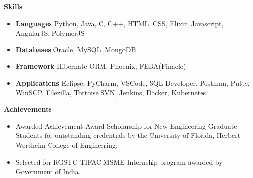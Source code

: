 \documentclass[letterpaper,12pt]{article}[leftmargin=*]
\def \entryspacing {-2pt}
\def \entryspacingnew {-4pt}
\renewcommand{\section}[2]{\vspace{5pt}
  \colorbox{secondary}{\color{white}\raggedbottom\normalsize\textbf{{#1}{\hspace{7pt}#2}}}
}
\newcommand{\resumeEntryStart}{\begin{itemize}[leftmargin=2.5mm]\vspace{\entryspacingnew}}
\newcommand{\resumeEntryEnd}{\end{itemize}\vspace{\entryspacingnew}}
\newcommand{\resumeItemListStart}{\begin{itemize}[leftmargin=4.5mm]}
\newcommand{\resumeItemListEnd}{\end{itemize}\vspace{\entryspacing}}
\newcommand{\resumeItem}[1]{
  \item\small{
    {#1 \vspace{-2pt}}
  }
}
\newcommand{\resumeEntryS}[2]{
  \item[]\small{
    \textbf{\color{primary}#1 }{ #2 \vspace{-6pt}}
  }
}
\begin{document}
  
 
   
 


\vspace{3pt}
\hspace{-15pt}\section{\faGears}{Skills}
 \resumeEntryStart
  \resumeEntryS{Languages } {Python, Java, C, C++, HTML, CSS, Elixir, Javascript, AngularJS, PolymerJS}
  \resumeEntryS{Databases } {Oracle, MySQL ,MongoDB}
  \resumeEntryS{Framework } {Hibernate ORM, Phoenix, FEBA(Finacle)}
  \resumeEntryS{Applications } {Eclipse, PyCharm, VSCode,  SQL Developer, Postman, Putty, WinSCP, Filezilla, Tortoise SVN, Jenkins, Docker, Kubernetes }
 \resumeEntryEnd
\vspace{8pt}


\hspace{-15pt}\section{\faTrophy}{Achievements}

   \resumeEntryStart
 
    \resumeItemListStart
      \resumeItem {Awarded Achievement Award Scholarship for New Engineering Graduate Students for outstanding credentials  by the University of Florida, Herbert Wertheim College of Engineering.}
      
      \resumeItem{Selected for RGSTC-TIFAC-MSME Internship program awarded by Government of India.}
    \resumeItemListEnd
  \resumeEntryEnd
\end{document}
